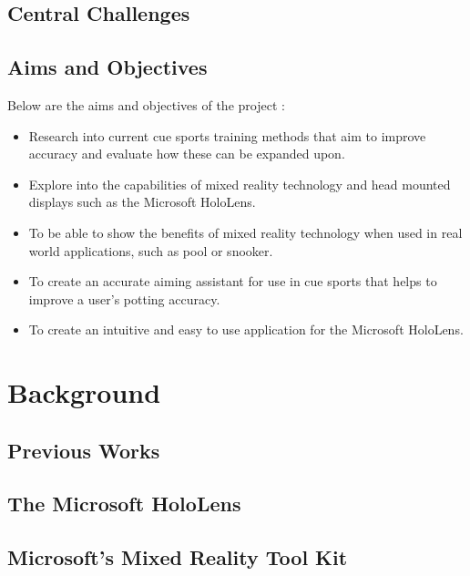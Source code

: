 \documentclass[ %
                author={Finn Alexander Wilkinson},
                supervisor={Dr. Andrew Calway},
                degree={MEng},
                title={\centering A Mixed Reality Aim Assistant for Pool and Snooker},
                subtitle={},
                type={Enterprise},
                year={2021} ]{dissertation}
\begin{document}
\section{Central Challenges}

\section{Aims and Objectives}
Below are the aims and objectives of the project :
\begin{itemize}
  \item Research into current cue sports training methods that aim to improve accuracy and evaluate how these can be expanded upon.
  \item Explore into the capabilities of mixed reality technology and head mounted displays such as the Microsoft HoloLens.
  \item To be able to show the benefits of mixed reality technology when used in real world applications, such as pool or snooker.
  \item To create an accurate aiming assistant for use in cue sports that helps to improve a user's potting accuracy.
  \item To create an intuitive and easy to use application for the Microsoft HoloLens.
\end{itemize}



\chapter{Background}
\label{chap:background}

\section{Previous Works}

\section{The Microsoft HoloLens}

\section{Microsoft's Mixed Reality Tool Kit}
\end{document}
